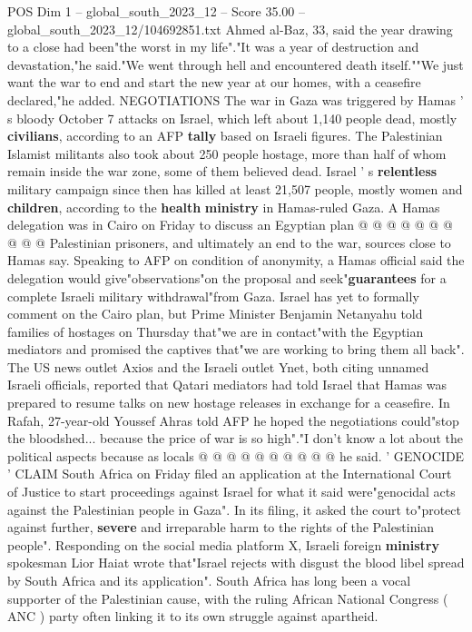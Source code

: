 \begin{textsample}{POS Dim 1 – global\_south\_2023\_12 – Score 35.00 – global\_south\_2023\_12/104692851.txt}
Ahmed al-Baz, 33, said the year drawing to a close had been"the worst in my life"."It was a year of destruction and devastation,"he said."We went through hell and encountered death itself.""We just want the war to end and start the new year at our homes, with a ceasefire declared,"he added.
NEGOTIATIONS The war in Gaza was triggered by Hamas ' s bloody October 7 attacks on Israel, which left about 1,140 people dead, mostly \textbf{civilians}, according to an AFP \textbf{tally} based on Israeli figures.
The Palestinian Islamist militants also took about 250 people hostage, more than half of whom remain inside the war zone, some of them believed dead.
Israel ' s \textbf{relentless} military campaign since then has killed at least 21,507 people, mostly women and \textbf{children}, according to the \textbf{health} \textbf{ministry} in Hamas-ruled Gaza.
A Hamas delegation was in Cairo on Friday to discuss an Egyptian plan @ @ @ @ @ @ @ @ @ @ Palestinian prisoners, and ultimately an end to the war, sources close to Hamas say.
Speaking to AFP on condition of anonymity, a Hamas official said the delegation would give"observations"on the proposal and seek"\textbf{guarantees} for a complete Israeli military withdrawal"from Gaza.
Israel has yet to formally comment on the Cairo plan, but Prime Minister Benjamin Netanyahu told families of hostages on Thursday that"we are in contact"with the Egyptian mediators and promised the captives that"we are working to bring them all back".
The US news outlet Axios and the Israeli outlet Ynet, both citing unnamed Israeli officials, reported that Qatari mediators had told Israel that Hamas was prepared to resume talks on new hostage releases in exchange for a ceasefire.
In Rafah, 27-year-old Youssef Ahras told AFP he hoped the negotiations could"stop the bloodshed... because the price of war is so high"."I don't know a lot about the political aspects because as locals @ @ @ @ @ @ @ @ @ @ he said. ' GENOCIDE ' CLAIM South Africa on Friday filed an application at the International Court of Justice to start proceedings against Israel for what it said were"genocidal acts against the Palestinian people in Gaza".
In its filing, it asked the court to"protect against further, \textbf{severe} and irreparable harm to the rights of the Palestinian people".
Responding on the social media platform X, Israeli foreign \textbf{ministry} spokesman Lior Haiat wrote that"Israel rejects with disgust the blood libel spread by South Africa and its application".
South Africa has long been a vocal supporter of the Palestinian cause, with the ruling African National Congress ( ANC ) party often linking it to its own struggle against apartheid.

\end{textsample}
